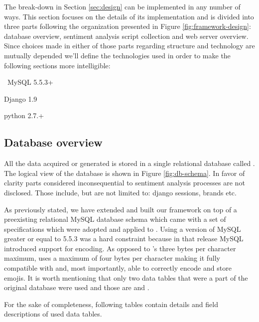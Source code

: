 The break-down in Section \ref{sec:design} can be implemented in any number of ways. 
This section focuses on the details of its implementation and is divided into three parts following the organization presented in Figure \ref{fig:framework-design}: database overview, sentiment analysis script collection and web server overview. Since choices made in either of those parts regarding structure and technology are mutually depended we'll define the technologies used in order to make the following sections more intelligible:
\begin{description}
\singlespacing
 \item[DBMS:] MySQL 5.5.3+
 \item[Web framework:] Django 1.9 
 \item[Sentiment analysis scripts:] python 2.7.+
\end{description}

\subsection*{Database overview\label{sec:database-overview}}
All the data acquired or generated is stored in a single relational database called . 
The logical view of the database is shown in Figure \ref{fig:db-schema}. 
In favor of clarity parts considered inconsequential to sentiment analysis processes are not disclosed. 
Those include, but are not limited to: django sessions, brands etc.


As previously stated, we have extended and built our framework on top of a preexisting relational MySQL database schema which came with a set of specifications which were adopted and applied to .
Using a version of MySQL greater or equal to 5.5.3 was a hard constraint because in that release MySQL introduced support for  encoding.  
As opposed to 's three bytes per character maximum, 
 uses a maximum of four bytes per character making it fully compatible with  and, most importantly, able to correctly encode and store emojis.
It is worth mentioning that only two data tables that were a part of the original database were used and those are  and .

For the sake of completeness, following tables contain details and field descriptions of used data tables. 

